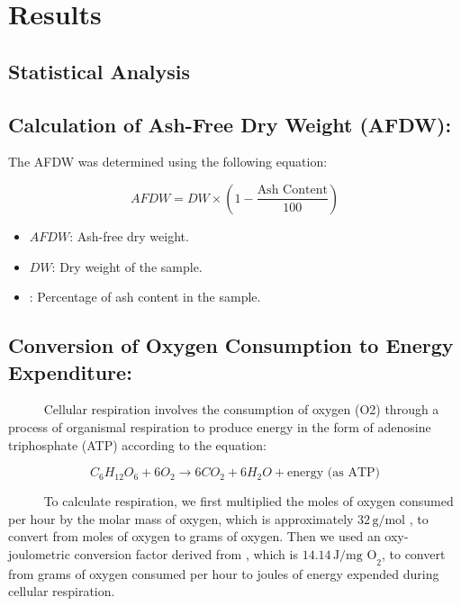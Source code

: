 \documentclass[
]{article}
\author{}
\date{\vspace{-2.5em}}
\begin{document}
\hypertarget{results}{%
\section{Results}\label{results}}

\hypertarget{statistical-analysis}{%
\subsection{Statistical Analysis}\label{statistical-analysis}}

\subsection*{Calculation of Ash-Free Dry Weight (AFDW):}

The AFDW was determined using the following equation:

\[
AFDW = DW \times \left(1 - \frac{{\text{Ash Content}}}{{100}}\right)
\]

\begin{itemize}
    \item \( AFDW \): Ash-free dry weight.
    \item \( DW \): Dry weight of the sample.
    \item {}: Percentage of ash content in the sample.
\end{itemize}

\subsection*{Conversion of Oxygen Consumption to Energy Expenditure:}

~~~~~ Cellular respiration involves the consumption of oxygen (O2)
through a process of organismal respiration to produce energy in the
form of adenosine triphosphate (ATP) \cite{babcock1992oxygen} according
to the equation:

\[
C_6H_{12}O_6 + 6O_2 \rightarrow 6CO_2 + 6H_2O + \text{energy (as ATP)}
\]

~~~~~ To calculate respiration, we first multiplied the moles of oxygen
consumed per hour by the molar mass of oxygen, which is approximately
\(32 \, \text{g/mol}\) \citep{hochachka1983protons}, to convert from
moles of oxygen to grams of oxygen. Then we used an oxy-joulometric
conversion factor derived from \cite{elliott1975energy}, which is
\(14.14 \, \text{J/mg O}_2\), to convert from grams of oxygen consumed
per hour to joules of energy expended during cellular respiration.
\end{document}

